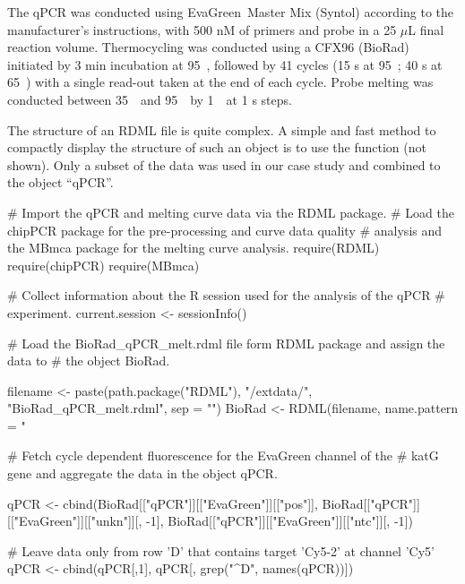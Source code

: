The qPCR was conducted using EvaGreen\circledR~Master Mix (Syntol) according to 
the manufacturer's instructions, with 500 nM of primers and probe in a 25 
$\mu$L 
final reaction volume. Thermocycling was conducted using a CFX96 (BioRad) 
initiated by 3 min incubation at 95~\textcelsius, followed by 41 cycles (15 s 
at 
95~\textcelsius; 40 s at 65~\textcelsius) with a single read-out 
taken at the end of each cycle. Probe melting was conducted between 
35~\textcelsius~and 95~\textcelsius~by 1~\textcelsius~at 1 s steps.

The structure of an RDML file is quite complex. A simple and fast method to 
compactly display the structure of such an object is to use the  
function (not shown). Only a subset of the data was used in our case study 
and combined to the object ``qPCR''.

\begin{example}
# Import the qPCR and melting curve data via the RDML package.
# Load the chipPCR package for the pre-processing and curve data quality
# analysis and the MBmca package for the melting curve analysis.
require(RDML)
require(chipPCR)
require(MBmca)

# Collect information about the R session used for the analysis of the qPCR
# experiment.
current.session <- sessionInfo()

# Load the BioRad_qPCR_melt.rdml file form RDML package and assign the data to 
# the object BioRad.

filename <- paste(path.package("RDML"), "/extdata/", 
		  "BioRad_qPCR_melt.rdml", sep = "")
BioRad <- RDML(filename, name.pattern = "%

# Fetch cycle dependent fluorescence for the EvaGreen channel of the 
# katG gene and aggregate the data in the object qPCR.

qPCR <- cbind(BioRad[["qPCR"]][["EvaGreen"]][["pos"]], 
	      BioRad[["qPCR"]][["EvaGreen"]][["unkn"]][, -1], 
	      BioRad[["qPCR"]][["EvaGreen"]][["ntc"]][, -1])
	      
# Leave data only from row 'D' that contains target 'Cy5-2' at channel 'Cy5'
qPCR <- cbind(qPCR[,1], qPCR[, grep("^D", names(qPCR))])
\end{example}

